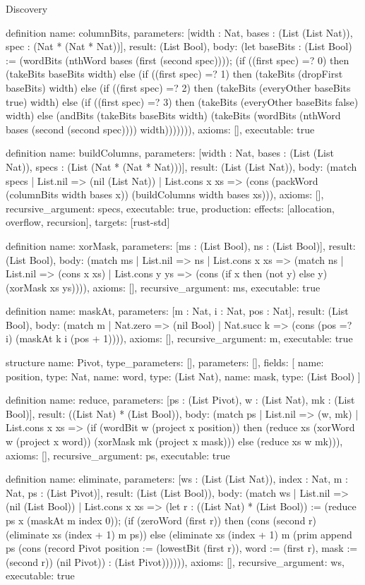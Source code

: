 \begin{lexlean}{Discovery}
\begin{semanticmodule}
definition{
  name: columnBits,
  parameters: [width : Nat, bases : (List (List Nat)), spec : (Nat * (Nat * Nat))],
  result: (List Bool),
  body: (let baseBits : (List Bool) := (wordBits (nthWord bases (first (second spec)))); (if ((first spec) =? 0) then (takeBits baseBits width) else (if ((first spec) =? 1) then (takeBits (dropFirst baseBits) width) else (if ((first spec) =? 2) then (takeBits (everyOther baseBits true) width) else (if ((first spec) =? 3) then (takeBits (everyOther baseBits false) width) else (andBits (takeBits baseBits width) (takeBits (wordBits (nthWord bases (second (second spec)))) width))))))),
  axioms: [],
  executable: true
}

definition{
  name: buildColumns,
  parameters: [width : Nat, bases : (List (List Nat)), specs : (List (Nat * (Nat * Nat)))],
  result: (List (List Nat)),
  body: (match specs
    | List.nil => (nil (List Nat))
    | List.cons x xs => (cons (packWord (columnBits width bases x)) (buildColumns width bases xs))),
  axioms: [],
  recursive_argument: specs,
  executable: true,
  production: {effects: [allocation, overflow, recursion], targets: [rust-std]}
}

definition{
  name: xorMask,
  parameters: [ms : (List Bool), ns : (List Bool)],
  result: (List Bool),
  body: (match ms
    | List.nil => ns
    | List.cons x xs => (match ns
    | List.nil => (cons x xs)
    | List.cons y ys => (cons (if x then (not y) else y) (xorMask xs ys)))),
  axioms: [],
  recursive_argument: ms,
  executable: true
}

definition{
  name: maskAt,
  parameters: [m : Nat, i : Nat, pos : Nat],
  result: (List Bool),
  body: (match m
    | Nat.zero => (nil Bool)
    | Nat.succ k => (cons (pos =? i) (maskAt k i (pos + 1)))),
  axioms: [],
  recursive_argument: m,
  executable: true
}

structure{
  name: Pivot,
  type_parameters: [],
  parameters: [],
  fields: [
    {name: position, type: Nat},
    {name: word, type: (List Nat)},
    {name: mask, type: (List Bool)}
  ]
}

definition{
  name: reduce,
  parameters: [ps : (List Pivot), w : (List Nat), mk : (List Bool)],
  result: ((List Nat) * (List Bool)),
  body: (match ps
    | List.nil => (w, mk)
    | List.cons x xs => (if (wordBit w (project x position)) then (reduce xs (xorWord w (project x word)) (xorMask mk (project x mask))) else (reduce xs w mk))),
  axioms: [],
  recursive_argument: ps,
  executable: true
}

definition{
  name: eliminate,
  parameters: [ws : (List (List Nat)), index : Nat, m : Nat, ps : (List Pivot)],
  result: (List (List Bool)),
  body: (match ws
    | List.nil => (nil (List Bool))
    | List.cons x xs => (let r : ((List Nat) * (List Bool)) := (reduce ps x (maskAt m index 0)); (if (zeroWord (first r)) then (cons (second r) (eliminate xs (index + 1) m ps)) else (eliminate xs (index + 1) m (prim append ps (cons (record Pivot {position := (lowestBit (first r)), word := (first r), mask := (second r)}) (nil Pivot)) : (List Pivot)))))),
  axioms: [],
  recursive_argument: ws,
  executable: true
}


\end{semanticmodule}
\end{lexlean}
